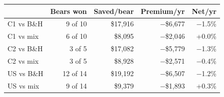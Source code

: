 \begin{tabular}{lrrrr}
\toprule
 & Bears won & Saved/bear & Premium/yr & Net/yr \\
\midrule
C1 vs B\&H & 9 of 10 & \$17,916 & $-$\$6,677 & $-$1.5\% \\
C1 vs mix & 6 of 10 & \$8,095 & $-$\$2,046 & +0.0\% \\
C2 vs B\&H & 3 of 5 & \$17,082 & $-$\$5,779 & $-$1.3\% \\
C2 vs mix & 3 of 5 & \$8,928 & $-$\$2,571 & $-$0.4\% \\
US vs B\&H & 12 of 14 & \$19,192 & $-$\$6,507 & $-$1.2\% \\
US vs mix & 9 of 14 & \$9,379 & $-$\$1,893 & +0.3\% \\
\bottomrule
\end{tabular}
